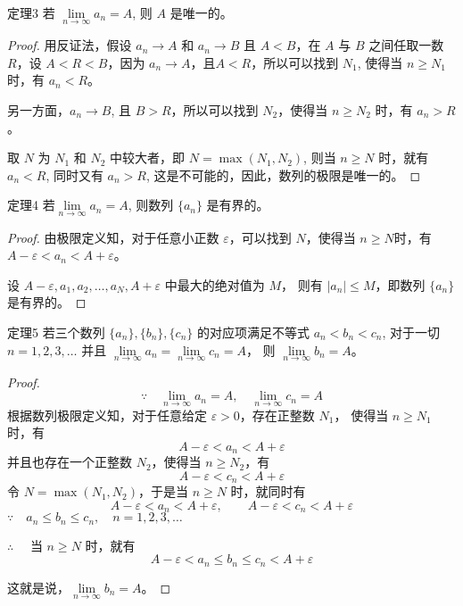 \begin{Theorem}{定理3}
  若 $\lim\limits_{n\to\infty}a_n=A$, 则 $A$ 是唯一的。
\end{Theorem}

\begin{proof}
用反证法，假设 $a_n\to A$ 和 $a_n\to B$ 且 $A<B$，在 $A$ 与 $B$ 之间任取一数 $R$，设 $A<R<B$，因为 $a_n\to A$，且$A<R$，所以可以找到 $N_1$, 使得当 $n\geqslant N_1$ 时，有 $a_n<R$。

另一方面，$a_n\to B$, 且 $B>R$，所以可以找到 $N_2$，使得当 $n\geqslant N_2$ 时，有 $a_n>R$。

取 $N$ 为 $N_1$ 和 $N_2$ 中较大者，即 $N=\max(N_1,N_2)$, 则当 $n\geqslant N$ 时，就有 $a_n<R$, 同时又有 $a_n>R$, 这是不可能的，因此，数列的极限是唯一的。
\end{proof}

\begin{Theorem}{定理4}
  若$\lim\limits_{n\to\infty}a_n=A$, 则数列 $\{a_n\}$ 是有界的。
\end{Theorem}    

\begin{proof}
由极限定义知，对于任意小正数 $\varepsilon$，可以找到 $N$，使得当 $n\geqslant N$时，有 $A-\varepsilon<a_n<A+\varepsilon$。

设 $A-\varepsilon,a_1,a_2,\ldots,a_N,A+\varepsilon$ 中最大的绝对值为 $M$，
则有 $|a_n|\leqslant M$，即数列 $\{a_n\}$是有界的。
\end{proof}

\begin{Theorem}{定理5}
  若三个数列 $\{a_n\},\{b_n\},\{c_n\}$ 的对应项满足不等式 $a_n<b_n<c_n$, 对于一切 $n=1,2,3,\ldots$ 并且 $\lim\limits_{n\to\infty}a_n=\lim\limits_{n\to\infty}c_n=A$，
则 $\lim\limits_{n\to\infty}b_n=A$。
\end{Theorem}

\begin{proof}
\[\because\quad \lim_{n\to\infty}a_n=A,\quad \lim_{n\to\infty}c_n=A\]
根据数列极限定义知，对于任意给定 $\varepsilon >0$，存在正整数 $N_1$，
使得当 $n\ge N_1$ 时，有
\[A-\varepsilon <a_n<A+\varepsilon\] 
并且也存在一个正整数 $N_2$，使得当 $n\geqslant N_2$，有
\[A-\varepsilon <c_n<A+\varepsilon\]
令 $N=\max(N_1,N_2)$，于是当 $n\geqslant N$ 时，就同时有
\[A-\varepsilon <a_n<A+\varepsilon ,\qquad A-\varepsilon <c_n<A+\varepsilon \]
$\because\quad a_n\le b_n\le c_n,\quad n=1,2,3,\ldots$

$\therefore\quad $ 当 $n\geqslant N$ 时，就有
\[A-\varepsilon <a_n\le b_n\le c_n<A+\varepsilon\]

这就是说，$\lim\limits_{n\to\infty}b_n=A$。
\end{proof}

